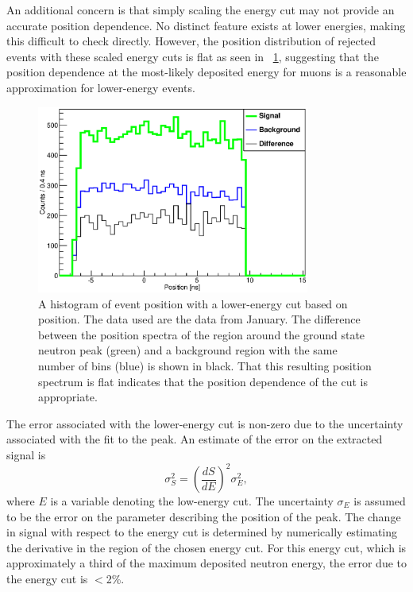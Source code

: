 An additional concern is that simply scaling the energy cut may not provide an accurate position dependence.  No distinct feature exists at lower energies, making this difficult to check directly.  However, the position distribution of rejected events with these scaled energy cuts is flat as seen in {\fig}~\ref{fig:flatPositionSpectrum}, suggesting that the position dependence at the most-likely deposited energy for muons is a reasonable approximation for lower-energy events.
\begin{figure}[!htbp]
\centering
\includegraphics[width=0.8\textwidth]{figures/PositionSpectrum2.eps}
\caption[Testing the validity of the scaled low-energy position cut with position spectra from \MgReaction.]{A histogram of event position with a lower-energy cut based on position.  The data used are the \MgReaction data from January.  The difference between the position spectra of the region around the ground state neutron peak (green) and a background region with the same number of bins (blue) is shown in black.  That this resulting position spectrum is flat indicates that the position dependence of the cut is appropriate.}
\label{fig:flatPositionSpectrum}
\end{figure}

The error associated with the lower-energy cut is non-zero due to the uncertainty associated with the fit to the peak.  An estimate of the error on the extracted signal is
\begin{equation}
\sigma_S^2 = \left( \frac{dS}{dE} \right)^2 \sigma_E^2, 
\end{equation}
where $E$ is a variable denoting the low-energy cut.  The uncertainty $\sigma_E$ is assumed to be the error on the parameter describing the position of the peak.  The change in signal with respect to the energy cut is determined by numerically estimating the derivative in the region of the chosen energy cut.  For this energy cut, which is approximately a third of the maximum deposited neutron energy, the error due to the energy cut is $<$2\%.



